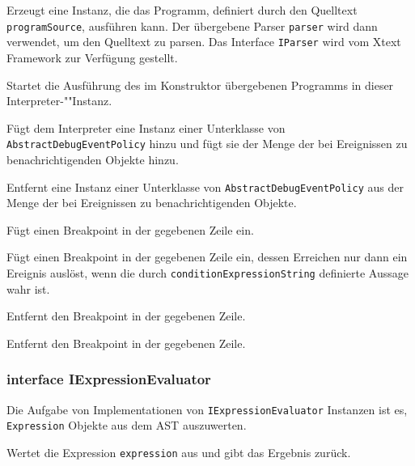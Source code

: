 \begin{description}
    Erzeugt eine Instanz, die das Programm, definiert durch den Quelltext \texttt{programSource}, ausführen kann. Der übergebene Parser \texttt{parser} wird dann verwendet, um den Quelltext zu parsen. Das Interface \texttt{IParser} wird vom Xtext Framework zur Verfügung gestellt.

    Startet die Ausführung des im Konstruktor übergebenen Programms in dieser Interpreter-""Instanz.

    Fügt dem Interpreter eine Instanz einer Unterklasse von \texttt{AbstractDebugEventPolicy} hinzu und fügt sie der Menge der bei Ereignissen zu benachrichtigenden Objekte hinzu.

    Entfernt eine Instanz einer Unterklasse von \texttt{AbstractDebugEventPolicy} aus der Menge der bei Ereignissen zu benachrichtigenden Objekte.

    Fügt einen Breakpoint in der gegebenen Zeile ein.

    Fügt einen Breakpoint in der gegebenen Zeile ein, dessen Erreichen nur dann ein Ereignis auslöst, wenn die durch \texttt{conditionExpressionString} definierte Aussage wahr ist.

    Entfernt den Breakpoint in der gegebenen Zeile.

    Entfernt den Breakpoint in der gegebenen Zeile.

\end{description}

\subsubsection{interface IExpressionEvaluator}
Die Aufgabe von Implementationen von \texttt{IExpressionEvaluator} Instanzen ist es, \texttt{Expression} Objekte aus dem AST auszuwerten.
\begin{description}
    Wertet die Expression \texttt{expression} aus und gibt das Ergebnis zurück.
\end{description}

